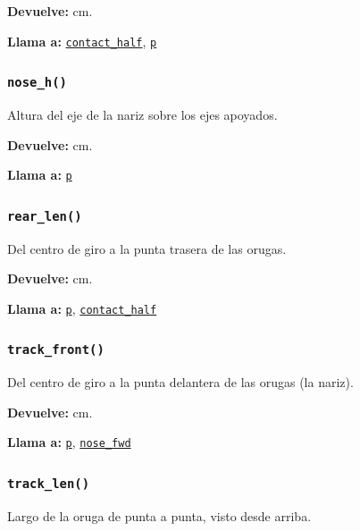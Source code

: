 \noindent\textbf{Devuelve:} cm.\par
\noindent\textbf{Llama a:} \hyperref[fn:geometry:contact-half]{\texttt{contact\_\allowbreak{}half}}, \hyperref[fn:geometry:p]{\texttt{p}}\par

\subsubsection{\texttt{nose\_\allowbreak{}h()}}\label{fn:geometry:nose-h}
\noindent Altura del eje de la nariz sobre los ejes apoyados.

\noindent\textbf{Devuelve:} cm.\par
\noindent\textbf{Llama a:} \hyperref[fn:geometry:p]{\texttt{p}}\par

\subsubsection{\texttt{rear\_\allowbreak{}len()}}\label{fn:geometry:rear-len}
\noindent Del centro de giro a la punta trasera de las orugas.

\noindent\textbf{Devuelve:} cm.\par
\noindent\textbf{Llama a:} \hyperref[fn:geometry:p]{\texttt{p}}, \hyperref[fn:geometry:contact-half]{\texttt{contact\_\allowbreak{}half}}\par

\subsubsection{\texttt{track\_\allowbreak{}front()}}\label{fn:geometry:track-front}
\noindent Del centro de giro a la punta delantera de las orugas (la nariz).

\noindent\textbf{Devuelve:} cm.\par
\noindent\textbf{Llama a:} \hyperref[fn:geometry:p]{\texttt{p}}, \hyperref[fn:geometry:nose-fwd]{\texttt{nose\_\allowbreak{}fwd}}\par

\subsubsection{\texttt{track\_\allowbreak{}len()}}\label{fn:geometry:track-len}
\noindent Largo de la oruga de punta a punta, visto desde arriba.

